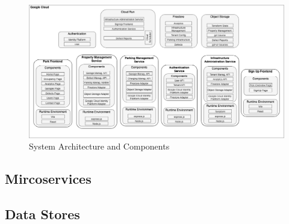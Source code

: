\begin{figure}[ht]
  \centering
  \includegraphics[width=\textwidth]{resources/03-runtime-view/03-system-architecture.png}
  \caption{System Architecture and Components }
  \label{fig:system-architecture}
\end{figure}

\subsection{Mircoservices}
\subsection{Data Stores}